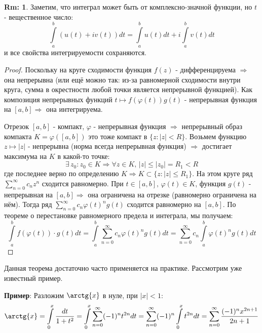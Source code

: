 \documentclass[12pt]{article}
\theoremstyle{definition}
\newtheorem{rem}{Rm:}
\newcommand{\ddsum}[2]{\displaystyle\sum\limits_{#1}^{#2}}
\newcommand{\ddint}[2]{\displaystyle\int\limits_{#1}^{#2}}
\begin{document}
\begin{rem}
	Заметим, что интеграл может быть от комплексно-значной функции, но $t$ - вещественное число:
	$$
		\ddint{a}{b}\left(u(t) + iv(t)\right)dt = \ddint{a}{b}u(t)dt + i\ddint{a}{b}v(t)dt
	$$
	и все свойства интегрируемости сохраняются.
\end{rem}
\begin{proof}
	Поскольку на круге сходимости функция $f(z)$ - дифференцируема $\Rightarrow$ она непрерывна (или ещё можно так: из-за равномерной сходимости внутри круга, сумма в окрестности любой точки является непрерывной функцией). Как композиция непрерывных функций $t \mapsto f\left(\varphi(t)\right)g(t)$ - непрерывная функция на $[a,b] \Rightarrow$ она интегрируема. 
	
	Отрезок $[a,b]$ - компакт, $\varphi$ - непрерывная функция $\Rightarrow$ непрерывный образ компакта $K = \varphi\left([a,b]\right)$ это тоже компакт в $\{z \colon |z| < R\}$. Возьмем функцию $z \mapsto |z|$ - непрерывна (норма всегда непрерывная функция) $\Rightarrow$ достигает максимума на $K$ в какой-то точке: 
	$$
		\exists \, z_0 \colon z_0 \in K \Rightarrow \forall z \in K, \, |z| \leq |z_0| = R_1 < R
	$$ 
	где последнее верно по определению $K \Rightarrow  K \subset \{z \colon |z| \leq R_1\}$. На этом круге ряд $\ddsum{n = 0}{\infty}c_n z^n$ сходится равномерно. При $t \in [a,b],\,   \varphi(t) \in K$, функция $g(t)$ - непрерывная на $[a,b] \Rightarrow$ она ограничена на отрезке (равномерно ограничена на нём). Тогда ряд $\ddsum{n = 0}{\infty}c_n \varphi(t)^n g(t)$ сходится равномерно на $[a,b]$. По теореме о перестановке равномерного предела и интеграла, мы получаем:
	$$
		\ddint{a}{b}f\left(\varphi(t)\right){\cdot}g(t)dt = \ddint{a}{b}\ddsum{n = 0}{\infty}c_n \varphi(t)^ng(t) dt = \ddsum{n = 0}{\infty}c_n \ddint{a}{b}\varphi(t)^ng(t)dt
	$$
\end{proof}

Данная теорема достаточно часто применяется на практике. Рассмотрим уже известный пример.

\textbf{Пример}: Разложим $\arctg{x}$ в нуле, при $|x| <1$:
$$
	\arctg{x} = \ddint{0}{x}\dfrac{dt}{1 + t^2} = \ddint{0}{x}\ddsum{n = 0}{\infty}(-1)^nt^{2n}dt = \ddsum{n = 0}{\infty}(-1)^n\ddint{0}{x}t^{2n} dt = \ddsum{n = 0}{\infty}\dfrac{(-1)^n x^{2n + 1}}{2n + 1}
$$
\end{document}
